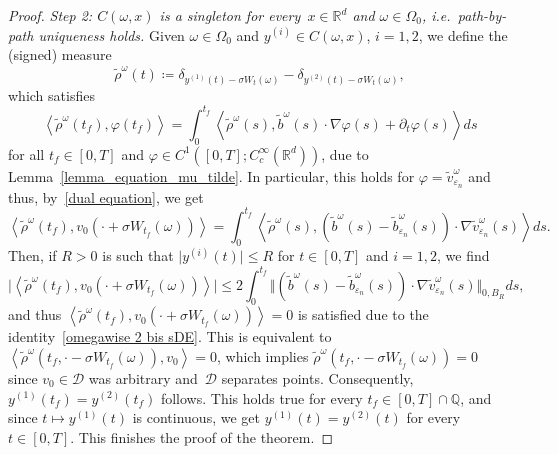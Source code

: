 \documentclass[a4paper,10pt]{article}
\newcommand\1{\mathbbm{1}}
\newcommand{\eps}{\varepsilon}
\numberwithin{equation}{section}
\begin{document}
\begin{proof}
\emph{Step 2: $C(\omega,x) $ is a singleton for every~$x \in \mathbb{R}^d$ and $\omega \in \Omega_0$, i.e.~path-by-path uniqueness holds.} Given $\omega\in \Omega_0$ and $y^{(i)}\in C(\omega,x)$, $i=1,2$, we define the (signed) measure
\begin{equation*}
\widetilde{\rho}^\omega(t)  \coloneqq \delta_{y^{(1)}(t) - \sigma W_t(\omega)}  - \delta_{y^{(2)}(t) - \sigma W_t(\omega)},
\end{equation*}
which satisfies
\begin{equation*}
\left\langle \widetilde{\rho}^\omega(t_{f})  ,\varphi(
t_{f})  \right\rangle =\int_{0}^{t_{f}}\left\langle \widetilde{\rho
}^\omega(s)  ,\widetilde{b}^\omega(s)
\cdot\nabla\varphi(s)  + \partial_t \varphi(s) \right\rangle ds
\end{equation*}
for all $t_{f}\in [0,T]$ and $\varphi\in C^{1}([0,T];C_{c}^{\infty}(\mathbb{R}^{d}))$, due to Lemma~\ref{lemma_equation_mu_tilde}. In particular, this holds for $\varphi=\widetilde{v}_{\eps_{n}}^\omega $ and thus, by~\eqref{dual equation}, we get 
\begin{equation*}
\left\langle \widetilde{\rho}^\omega(t_{f})  ,v_{0} (\cdot+\sigma W_{t_{f}}(\omega))  \right\rangle =\int_{0}^{t_{f}}\left\langle \widetilde{\rho}^\omega(s) ,(
\widetilde{b}^\omega(s)  -\widetilde{b}_{\eps_{n}}^\omega(s) )  \cdot\nabla\widetilde{v}_{\eps_{n}}^\omega(s)  \right\rangle ds .
\end{equation*}
Then, if $R>0$ is such that $\vert y^{(i)}(t)\vert \leq R$ for $t\in [0,T]$ and $i=1,2$, we find
\begin{equation*}
\big\vert \left\langle \widetilde{\rho}^\omega(t_{f})
,v_{0} (\cdot+\sigma W_{t_{f}}(\omega))
\right\rangle \big\vert \leq2\int_{0}^{t_{f}} \big\Vert (
\widetilde{b}^\omega(s)  -\widetilde{b}_{\eps_{n}}^\omega(s) )  \cdot\nabla\widetilde{v}_{\eps_{n}}^\omega(s) \big\Vert _{0,B_R}ds ,
\end{equation*}
and thus $\left\langle \widetilde{\rho}^\omega(t_{f}),v_{0}(\cdot+\sigma W_{t_{f}}(  \omega)  )\right\rangle =0$ is satisfied due to the identity~\eqref{omegawise 2 bis sDE}. This is equivalent to $\left\langle \widetilde{\rho}^\omega (t_{f},\cdot-\sigma W_{t_{f}}(\omega))  ,v_{0}\right\rangle =0$, which implies $\widetilde{\rho}^\omega(t_{f},\cdot-\sigma W_{t_{f}}(\omega))=0$ since $v_0 \in \mathcal{D}$ was arbitrary and~$\mathcal{D}$ separates points. Consequently, $y^{(1)}(t_{f})  =y^{(2)}(t_{f})$ follows. This holds true for every $t_{f}\in [0,T] \cap\mathbb{Q}$, and since $t\mapsto y^{(1)}(t)$ is continuous, we get $y^{(1)}(t) =y^{(2)}(t)$ for every~$t \in [0,T]$. This finishes the proof of the theorem.
\end{proof}
\end{document}
